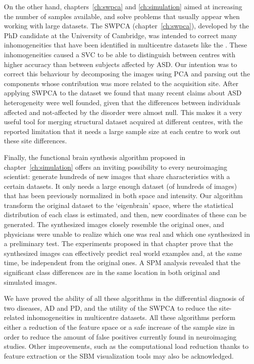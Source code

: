 On the other hand, chapters~\ref{ch:swpca} and \ref{ch:simulation} aimed at increasing the number of samples available, and solve problems that usually appear when working with large datasets. The \ac{SWPCA} (chapter~\ref{ch:swpca}), developed by the PhD candidate at the University of Cambridge, was intended to correct many inhomogeneities that have been identified in multicentre datasets like the \aimsmri{}. These inhomogeneities caused a \ac{SVC} to be able to distinguish between centres with higher accuracy than between subjects affected by \ac{ASD}. Our intention was to correct this behaviour by decomposing the images using \ac{PCA} and parsing out the components whose contribution was more related to the acquisition site. After applying \ac{SWPCA} to the dataset we found that many recent claims about \ac{ASD} heterogeneity \cite{haar2014anatomical} were well founded, given that the differences between individuals affected and not-affected by the disorder were almost null. This makes it a very useful tool for merging structural dataset acquired at different centres, with the reported limitation that it needs a large sample size at each centre to work out these site differences. 

Finally, the functional brain synthesis algorithm proposed in chapter~\ref{ch:simulation} offers an inviting possibility to every neuroimaging scientist: generate hundreds of new images that share characteristics with a certain datasets. It only needs a large enough dataset (of hundreds of images) that has been previously normalized in both space and intensity. Our algorithm transform the original dataset to the `eigenbrain' space, where the statistical distribution of each class is estimated, and then, new coordinates of these can be generated. The synthesized images closely resemble the original ones, and physicians were unable to realize which one was real and which one synthesized in a preliminary test. The experiments proposed in that chapter prove that the synthesized images can effectively predict real world examples and, at the same time, be independent from the original ones. A \ac{SPM} analysis revealed that the significant class differences are in the same location in both original and simulated images. 

We have proved the ability of all these algorithms in the differential diagnosis of two diseases, \ac{AD} and \ac{PD}, and the utility of the \ac{SWPCA} to reduce the site-related inhomogeneities in multicentre datasets. All these algorithms perform either a reduction of the feature space or a safe increase of the sample size in order to reduce the amount of false positives currently found in neuroimaging studies. Other improvements, such as the computational load reduction thanks to feature extraction or the \ac{SBM} visualization tools may also be acknowledged. 



